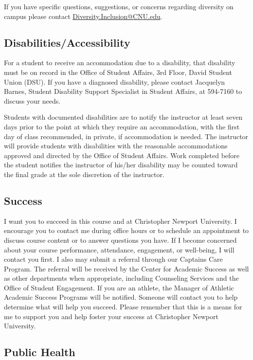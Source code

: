 \documentclass[11pt]{article}
\begin{document}
If you have specific questions, suggestions, or concerns regarding diversity on campus please contact \href{mailto:Diversity.Inclusion@CNU.edu}{Diversity.Inclusion@CNU.edu}.

\subsection{Disabilities/Accessibility}

For a student to receive an accommodation due to a disability, that disability must be on record in the Office of Student Affairs, 3rd Floor, David Student Union (DSU). If you have a diagnosed disability, please contact Jacquelyn Barnes, Student Disability Support Specialist in Student Affairs, at 594-7160 to discuss your needs.

Students with documented disabilities are to notify the instructor at least seven days prior to the point at which they require an accommodation, with the first day of class recommended, in private, if accommodation is needed. The instructor will provide students with disabilities with the reasonable accommodations approved and directed by the Office of Student Affairs. Work completed before the student notifies the instructor of his/her disability may be counted toward the final grade at the sole discretion of the instructor.

\subsection{Success}

I want you to succeed in this course and at Christopher Newport University. I encourage you to contact me during office hours or to schedule an appointment to discuss course content or to answer questions you have. If I become concerned about your course performance, attendance, engagement, or well-being, I will contact you first. I also may submit a referral through our Captains Care Program. The referral will be received by the Center for Academic Success as well as other departments when appropriate, including Counseling Services and the Office of Student Engagement. If you are an athlete, the Manager of Athletic Academic Success Programs will be notified. Someone will contact you to help determine what will help you succeed. Please remember that this is a means for me to support you and help foster your success at Christopher Newport University.

\subsection{Public Health}
\end{document}
